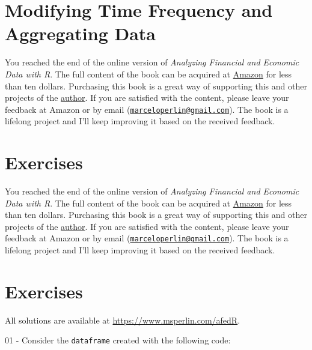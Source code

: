 \documentclass[
  12pt,
]{book}
\newenvironment{pleasebuyit}
{\begin{noteblock}
		
	} {\end{noteblock}}
\begin{document}
\hypertarget{modifying-time-frequency-and-aggregating-data}{%
\section{Modifying Time Frequency and Aggregating Data}\label{modifying-time-frequency-and-aggregating-data}}

\begin{pleasebuyit}
You reached the end of the online version of \emph{Analyzing Financial
and Economic Data with R}. The full content of the book can be acquired
at \href{https://www.amazon.com/dp/B084LSNXMN}{Amazon} for less than ten
dollars. Purchasing this book is a great way of supporting this and
other projects of the \href{https://www.msperlin.com/blog/}{author}. If
you are satisfied with the content, please leave your feedback at Amazon
or by email
(\href{mailto:marceloperlin@gmail.com}{\nolinkurl{marceloperlin@gmail.com}}).
The book is a lifelong project and I'll keep improving it based on the
received feedback.
\end{pleasebuyit}

\hypertarget{exercises-7}{%
\section{Exercises}\label{exercises-7}}

\begin{pleasebuyit}
You reached the end of the online version of \emph{Analyzing Financial
and Economic Data with R}. The full content of the book can be acquired
at \href{https://www.amazon.com/dp/B084LSNXMN}{Amazon} for less than ten
dollars. Purchasing this book is a great way of supporting this and
other projects of the \href{https://www.msperlin.com/blog/}{author}. If
you are satisfied with the content, please leave your feedback at Amazon
or by email
(\href{mailto:marceloperlin@gmail.com}{\nolinkurl{marceloperlin@gmail.com}}).
The book is a lifelong project and I'll keep improving it based on the
received feedback.
\end{pleasebuyit}

\hypertarget{exercises-8}{%
\section{Exercises}\label{exercises-8}}

All solutions are available at \url{https://www.msperlin.com/afedR}.

01 -
Consider the \texttt{dataframe} created with the following code:
\end{document}
